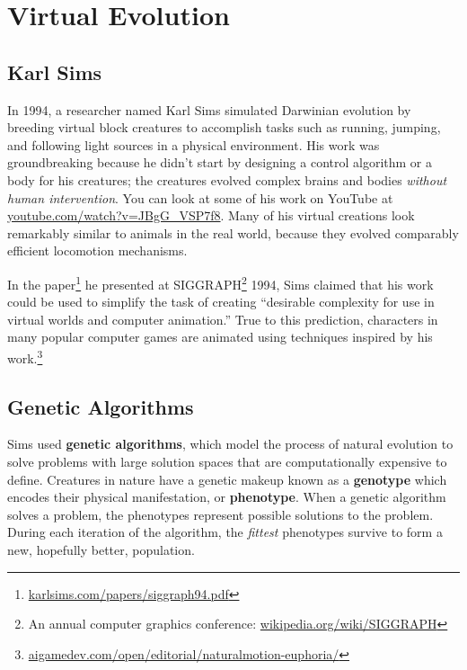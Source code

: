 \documentclass[10pt]{book}
\begin{document}
\mainmatter

\newcommand{\TODO}{\hl{\emph{TODO:}}\hl}

\chapter{Virtual Evolution}

\section{Karl Sims}

In 1994, a researcher named Karl Sims simulated Darwinian evolution by breeding 
virtual block creatures to accomplish tasks such as running, jumping, and following 
light sources in a physical environment. His work was groundbreaking because he didn't 
start by designing a control algorithm or a body for his creatures; the creatures 
evolved complex brains and bodies {\em without human intervention}. You can look at 
some of his work on YouTube at \url{youtube.com/watch?v=JBgG_VSP7f8}. Many of his virtual 
creations look remarkably similar to animals in the real world, because they evolved comparably efficient 
locomotion mechanisms.

In the paper\footnote{\url{karlsims.com/papers/siggraph94.pdf}} he presented at SIGGRAPH\footnote{An annual computer graphics 
conference: \url{wikipedia.org/wiki/SIGGRAPH}} 1994, Sims claimed that his work could be used to simplify the task of creating
``desirable complexity for use in virtual worlds and computer animation.'' True to this prediction, characters in many popular computer games 
are animated using techniques inspired by his work.\footnote{\url{aigamedev.com/open/editorial/naturalmotion-euphoria/}}

\section{Genetic Algorithms}

Sims used {\bf genetic algorithms}, which model the process of natural evolution to solve  
problems with large solution spaces that are computationally expensive to define. 
Creatures in nature have a genetic makeup known as a {\bf genotype} which encodes their physical 
manifestation, or {\bf phenotype}. When a genetic algorithm solves a problem, the phenotypes represent
possible solutions to the problem. During each iteration of the algorithm, the {\em fittest} 
phenotypes survive to form a new, hopefully better, population.
\end{document}
